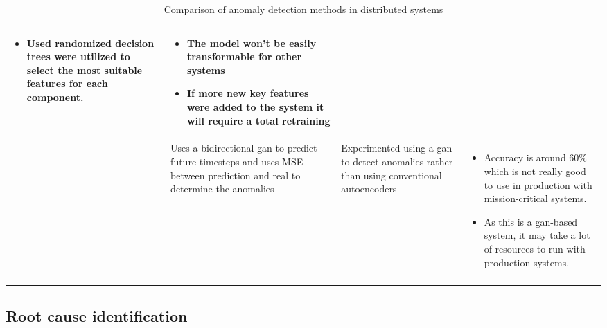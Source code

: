\begin{longtable}{| p{20mm} | p{43mm} | p{43mm} | p{43mm} |}
\begin{itemize}[leftmargin=*,noitemsep,nolistsep]
    \item Used randomized decision trees were utilized to select the most suitable features for each component.
  \vspace{-7mm}
  \end{itemize} &
  \vspace{-8mm}
  \begin{itemize}[leftmargin=*,noitemsep,nolistsep] 
    \item The model won't be easily transformable for other systems
    \item If more new key features were added to the system it will require a total retraining
  \vspace{-7mm}
  \end{itemize} \\ \hline
  \cite{kumarage2019generative} &
  Uses a bidirectional \ac{gan} to predict future timesteps and uses MSE between prediction and real to determine the anomalies &
  Experimented using a \ac{gan} to detect anomalies rather than using conventional autoencoders &
  \vspace{-8mm}
  \begin{itemize}[leftmargin=*,noitemsep,nolistsep] 
    \item Accuracy is around 60\% which is not really good to use in production with mission-critical systems.
    \item As this is a \ac{gan}-based system, it may take a lot of resources to run with production systems.
  \end{itemize} \\ \hline
  \caption{Comparison of anomaly detection methods in distributed systems}
\end{longtable}

\subsection{Root cause identification}


